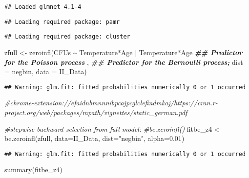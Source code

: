 \documentclass[
]{article}
\newenvironment{Shaded}{\begin{snugshade}}{\end{snugshade}}
\newcommand{\AttributeTok}[1]{\textcolor[rgb]{0.77,0.63,0.00}{#1}}
\newcommand{\CommentTok}[1]{\textcolor[rgb]{0.56,0.35,0.01}{\textit{#1}}}
\newcommand{\DocumentationTok}[1]{\textcolor[rgb]{0.56,0.35,0.01}{\textbf{\textit{#1}}}}
\newcommand{\FloatTok}[1]{\textcolor[rgb]{0.00,0.00,0.81}{#1}}
\newcommand{\FunctionTok}[1]{\textcolor[rgb]{0.00,0.00,0.00}{#1}}
\newcommand{\NormalTok}[1]{#1}
\newcommand{\OtherTok}[1]{\textcolor[rgb]{0.56,0.35,0.01}{#1}}
\newcommand{\SpecialCharTok}[1]{\textcolor[rgb]{0.00,0.00,0.00}{#1}}
\newcommand{\StringTok}[1]{\textcolor[rgb]{0.31,0.60,0.02}{#1}}
\begin{document}
\begin{verbatim}
## Loaded glmnet 4.1-4
\end{verbatim}

\begin{verbatim}
## Loading required package: pamr
\end{verbatim}

\begin{verbatim}
## Loading required package: cluster
\end{verbatim}

\begin{Shaded}
\begin{Highlighting}[]
\NormalTok{zfull }\OtherTok{\textless{}{-}} \FunctionTok{zeroinfl}\NormalTok{(CFUs }\SpecialCharTok{\textasciitilde{}}\NormalTok{ Temperature}\SpecialCharTok{*}\NormalTok{Age }\SpecialCharTok{|}\NormalTok{ Temperature}\SpecialCharTok{*}\NormalTok{Age }\DocumentationTok{\#\# Predictor for the Poisson process}
\NormalTok{                  , }\DocumentationTok{\#\# Predictor for the Bernoulli process;}
 \AttributeTok{dist =} \StringTok{\textquotesingle{}negbin\textquotesingle{}}\NormalTok{, }\AttributeTok{data =}\NormalTok{ II\_Data)}
\end{Highlighting}
\end{Shaded}

\begin{verbatim}
## Warning: glm.fit: fitted probabilities numerically 0 or 1 occurred
\end{verbatim}

\begin{Shaded}
\begin{Highlighting}[]
\CommentTok{\#chrome{-}extension://efaidnbmnnnibpcajpcglclefindmkaj/https://cran.r{-}project.org/web/packages/mpath/vignettes/static\_german.pdf}

\CommentTok{\#stepwise backward selection from full model:}
\CommentTok{\#be.zeroinfl()}
\NormalTok{fitbe\_z4 }\OtherTok{\textless{}{-}} \FunctionTok{be.zeroinfl}\NormalTok{(zfull, }\AttributeTok{data=}\NormalTok{II\_Data, }\AttributeTok{dist=}\StringTok{"negbin"}\NormalTok{, }\AttributeTok{alpha=}\FloatTok{0.01}\NormalTok{) }
\end{Highlighting}
\end{Shaded}

\begin{verbatim}
## Warning: glm.fit: fitted probabilities numerically 0 or 1 occurred
\end{verbatim}

\begin{Shaded}
\begin{Highlighting}[]
\FunctionTok{summary}\NormalTok{(fitbe\_z4)}
\end{Highlighting}
\end{Shaded}
\end{document}
